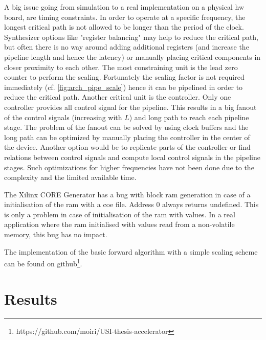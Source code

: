\documentclass[mscthesis]{usiinfthesis}
\begin{document}
A big issue going from simulation to a real implementation on a physical
\gls{hw} board, are timing constraints. In order to operate at a specific
frequency, the longest critical path is not allowed to be longer than the
period of the clock. Synthesizer options like "register balancing" may help to
reduce the critical path, but often there is no way around adding additional
registers (and increase the pipeline length and hence the latency) or manually
placing critical components in closer proximity to each other. The most
constraining unit is the lead zero counter to perform the scaling. Fortunately
the scaling factor is not required immediately (cf. \ref{fig:arch_pipe_scale})
hence it can be pipelined in order to reduce the critical path. Another critical
unit is the controller. Only one controller provides all control signal for the
pipeline. This results in a big fanout of the control signals (increasing with
$L$) and long path to reach each pipeline stage. The problem of the fanout can
be solved by using clock buffers and the long path can be optimized by manually
placing the controller in the center of the device. Another option would be to
replicate parts of the controller or find relations between control signals and
compute local control signals in the pipeline stages.  Such optimizations for
higher frequencies have not been done due to the complexity and the limited
available time.

The Xilinx CORE Generator has a bug with block \gls{ram} generation in case
of a initialisation of the \gls{ram} with a coe file. Address 0 always returns
undefined. This is only a problem in case of initialisation of the \gls{ram}
with values. In a real application where the \gls{ram} initialised with values
read from a non-volatile memory, this bug has no impact.

The implementation of the basic forward algorithm with a simple scaling scheme
can be found on
github\footnote{https://github.com/moiri/USI-thesis-accelerator}.

\chapter{Results}
\label{ch:results}
\glsresetall %
\end{document}
